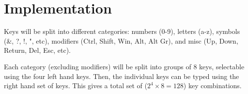 \documentclass{article}
\begin{document}
\section{Implementation}
Keys will be split into different categories: numbers (0-9), letters (a-z), symbols (\&, ?, !, ", etc), modifiers (Ctrl, Shift, Win, Alt, Alt Gr), and misc (Up, Down, Return, Del, Esc, etc).

Each category (excluding modifiers) will be split into groups of 8 keys, selectable using the four left hand keys. Then, the individual keys can be typed using the right hand set of keys. This gives a total set of ($2^4 \times 8 = 128$) key combinations.








\end{document}
